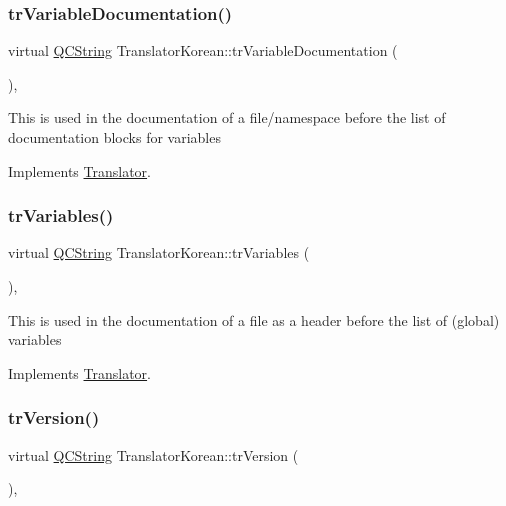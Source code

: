 \subsubsection{\texorpdfstring{trVariableDocumentation()}{trVariableDocumentation()}}
{\footnotesize\ttfamily virtual \mbox{\hyperlink{class_q_c_string}{Q\+C\+String}} Translator\+Korean\+::tr\+Variable\+Documentation (\begin{DoxyParamCaption}{ }\end{DoxyParamCaption})\hspace{0.3cm}{\ttfamily [inline]}, {\ttfamily [virtual]}}

This is used in the documentation of a file/namespace before the list of documentation blocks for variables 

Implements \mbox{\hyperlink{class_translator}{Translator}}.

\mbox{\label{class_translator_korean_aed04ca3a039ac6abf08497c6dbb53030}} 
\subsubsection{\texorpdfstring{trVariables()}{trVariables()}}
{\footnotesize\ttfamily virtual \mbox{\hyperlink{class_q_c_string}{Q\+C\+String}} Translator\+Korean\+::tr\+Variables (\begin{DoxyParamCaption}{ }\end{DoxyParamCaption})\hspace{0.3cm}{\ttfamily [inline]}, {\ttfamily [virtual]}}

This is used in the documentation of a file as a header before the list of (global) variables 

Implements \mbox{\hyperlink{class_translator}{Translator}}.

\mbox{\label{class_translator_korean_ac488c12c6596eb95556cd86fb8caa947}} 
\subsubsection{\texorpdfstring{trVersion()}{trVersion()}}
{\footnotesize\ttfamily virtual \mbox{\hyperlink{class_q_c_string}{Q\+C\+String}} Translator\+Korean\+::tr\+Version (\begin{DoxyParamCaption}{ }\end{DoxyParamCaption})\hspace{0.3cm}{\ttfamily [inline]}, {\ttfamily [virtual]}}

